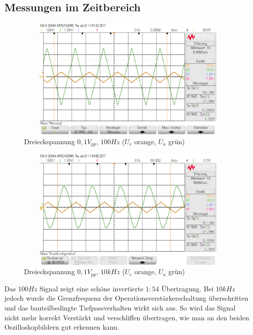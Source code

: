 \subsection{Messungen im Zeitbereich}
\begin{figure}[H]
 \begin{center}
  \includegraphics[height=6cm,width=12cm]{OsziBilder/InvVer_100Hz}
 \end{center}
 \caption{Dreieckspannung $0,1V_{pp}$, $100Hz$ ($U_e$ orange, $U_a$ grün)}
\end{figure}

\begin{figure}[H]
 \begin{center}
  \includegraphics[height=6cm,width=12cm]{OsziBilder/InvVer_10kHz}
 \end{center}
 \caption{Dreieckspannung $0,1V_{pp}$, $10kHz$ ($U_e$ orange, $U_a$ grün)}
\end{figure}
\noindent
Das $100Hz$ Signal zeigt eine schöne invertierte $1:54$ Übertragung. Bei $10kHz$ jedoch
wurde die Grenzfrequenz der Operationsverstärkerschaltung überschritten und das bauteilbedingte
Tiefpassverhalten wirkt sich aus. So wird das Signal nicht mehr korrekt Verstärkt und verschliffen übertragen, wie man an den beiden Oszilloskopbildern gut erkennen kann.\\
\newpage


